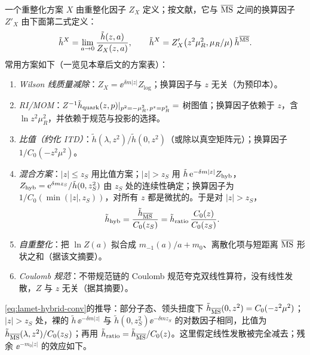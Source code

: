 \begin{definition}[准关联函数的重整化方案]\label{def:lamet-schemes}
一个重整化方案 $X$ 由重整化因子 $Z_X$ 定义；按文献\cite{IzubuchiEtAl2018}，它与 $\overline{\mathrm{MS}}$ 之间的换算因子 $Z'_X$ 由下面第二式定义：
\[
\tilde h^X=\lim_{a\to0}\frac{\tilde h(z,a)}{Z_X(z,a)},\qquad \tilde h^X=Z'_X\big(z^2\mu_R^2,\mu_R/\mu\big)\,\tilde h^{\overline{\mathrm{MS}}}.
\]
常用方案如下（一览见本章后文的方案表）：
\begin{enumerate}[label=(\roman*),leftmargin=2em,itemsep=1pt,topsep=2pt]
\item \emph{Wilson 线质量减除}：$Z_X=\ee^{\delta m|z|}Z_{\log}$；换算因子与 $z$ 无关\cite{Chen:2016fxx,Ishikawa:2016znu,Green:2017xeu}（\cite{Ishikawa:2016znu}为预印本）。
\item \emph{RI/MOM}：$Z^{-1}\tilde h_{\rm quark}(z,p)|_{p^2=-\mu_R^2,\,p^z=p^z_R}=$ 树图值；换算因子依赖于 $z$，含 $\ln z^2\mu_R^2$，并依赖于规范与投影的选择\cite{Constantinou:2017sej,Stewart:2017tvs,Alexandrou:2017huk,Chen:2017mzz,LatticeParton:2018gjr}。
\item \emph{比值（约化 ITD）}：$\tilde h(\lambda,z^2)/\tilde h(0,z^2)$（或除以真空矩阵元）；换算因子 $1/C_0(-z^2\mu^2)$\cite{Radyushkin2017,Orginos:2017kos,Braun:2018brg}。
\item \emph{混合方案}：$|z|\le z_S$ 用比值方案；$|z|>z_S$ 用 $\tilde h\,\mathrm{e}^{-\delta m|z|}Z_{\rm hyb}$，$Z_{\rm hyb}=\mathrm{e}^{\delta mz_S}/\tilde h(0,z_S^2)$ 由 $z_S$ 处的连续性确定；换算因子为 $1/C_0(\min(|z|,z_S))$，对所有 $z$ 都是微扰的\cite{Ji:2020brr}。于是对 $|z|>z_S$，
\begin{equation}\label{eq:lamet-hybrid-conv}
\tilde h_{\rm hyb}=\frac{\tilde h_{\overline{\mathrm{MS}}}}{C_0(z_S)}=\tilde h_{\rm ratio}\,\frac{C_0(z)}{C_0(z_S)} .
\end{equation}%
\item \emph{自重整化}：把 $\ln Z(a)$ 拟合成 $m_{-1}(a)/a+m_0$、离散化项与短距离 $\overline{\mathrm{MS}}$ 形状之和\cite{LatticePartonLPC:2021gpi}（据该文摘要）。
\item \emph{Coulomb 规范}：不带规范链的 Coulomb 规范夸克双线性算符，没有线性发散，$Z$ 与 $z$ 无关\cite{Gao:2023lny,Zhao:2023ptv}（据其摘要）。
\end{enumerate}
\end{definition}

\cref{eq:lamet-hybrid-conv}的推导：部分子态、领头扭度下 $\tilde h_{\overline{\mathrm{MS}}}(0,z^2)=C_0(-z^2\mu^2)$；$|z|>z_S$ 处，裸的 $\tilde h\,\ee^{-\delta m|z|}$ 与 $\tilde h(0,z_S^2)\ee^{-\delta mz_S}$ 的对数因子相同，比值为 $\tilde h_{\overline{\mathrm{MS}}}(\lambda,z^2)/C_0(z_S)$；再用 $\tilde h_{\rm ratio}=\tilde h_{\overline{\mathrm{MS}}}/C_0(z)$。这里假定线性发散被完全减去；残余 $\ee^{-m_0|z|}$ 的效应如下。


